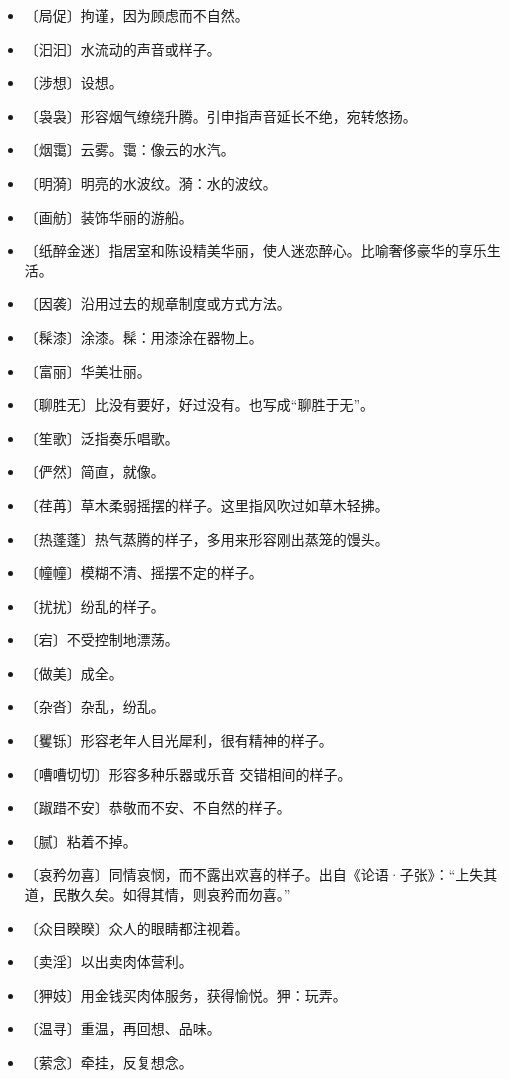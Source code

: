 \documentclass[12pt,UTF-8,openany]{ctexbook}
\begin{document}
\begin{itemize}
    \setlength\itemsep{-0.2em}
    \item 〔局促〕拘谨，因为顾虑而不自然。
    \item 〔汩汩〕水流动的声音或样子。
    \item 〔涉想〕设想。
    \item 〔袅袅〕形容烟气缭绕升腾。引申指声音延长不绝，宛转悠扬。
    \item 〔烟霭〕云雾。霭：像云的水汽。
    \item 〔明漪〕明亮的水波纹。漪：水的波纹。
    \item 〔画舫〕装饰华丽的游船。
    \item 〔纸醉金迷〕指居室和陈设精美华丽，使人迷恋醉心。比喻奢侈豪华的享乐生活。
    \item 〔因袭〕沿用过去的规章制度或方式方法。
    \item 〔髹漆〕涂漆。髹：用漆涂在器物上。
    \item 〔富丽〕华美壮丽。
    \item 〔聊胜无〕比没有要好，好过没有。也写成“聊胜于无”。
    \item 〔笙歌〕泛指奏乐唱歌。
    \item 〔俨然〕简直，就像。
    \item 〔荏苒〕草木柔弱摇摆的样子。这里指风吹过如草木轻拂。
    \item 〔热蓬蓬〕热气蒸腾的样子，多用来形容刚出蒸笼的馒头。
    \item 〔幢幢〕模糊不清、摇摆不定的样子。
    \item 〔扰扰〕纷乱的样子。
    \item 〔宕〕不受控制地漂荡。
    \item 〔做美〕成全。
    \item 〔杂沓〕杂乱，纷乱。
    \item 〔矍铄〕形容老年人目光犀利，很有精神的样子。
    \item 〔嘈嘈切切〕形容多种乐器或乐音 交错相间的样子。
    \item 〔踧踖不安〕恭敬而不安、不自然的样子。
    \item 〔腻〕粘着不掉。
    \item 〔哀矜勿喜〕同情哀悯，而不露出欢喜的样子。出自《论语·子张》：“上失其道，民散久矣。如得其情，则哀矜而勿喜。”
    \item 〔众目睽睽〕众人的眼睛都注视着。
    \item 〔卖淫〕以出卖肉体营利。
    \item 〔狎妓〕用金钱买肉体服务，获得愉悦。狎：玩弄。
    \item 〔温寻〕重温，再回想、品味。
    \item 〔萦念〕牵挂，反复想念。
\end{itemize}
\end{document}
